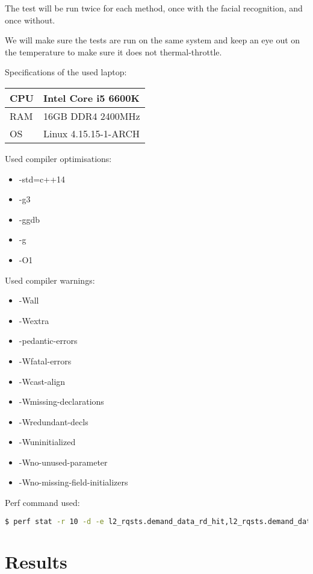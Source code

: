 \documentclass[a4paper]{article}
\begin{document}
The test will be run twice for each method, once with the facial recognition, and once without.

We will make sure the tests are run on the same system and keep an eye out on the temperature to make sure it does not thermal-throttle.

Specifications of the used laptop:
\begin{center}
    \begin{tabular}{ | l | l |}
    \hline
    CPU & Intel Core i5 6600K \cite{ARK} \\ \hline
    RAM & 16GB DDR4 2400MHz \\ \hline
    OS & Linux 4.15.15-1-ARCH \\ \hline
    \end{tabular}
\end{center}

Used compiler optimisations:
\begin{itemize}[noitemsep,nolistsep]
\item -std=c++14
\item -g3
\item -ggdb
\item -g
\item -O1
\end{itemize}

Used compiler warnings:
\begin{itemize}[noitemsep,nolistsep]
\item -Wall
\item -Wextra
\item -pedantic-errors
\item -Wfatal-errors
\item -Wcast-align
\item -Wmissing-declarations
\item -Wredundant-decls
\item -Wuninitialized
\item -Wno-unused-parameter
\item -Wno-missing-field-initializers
\end{itemize}

Perf command used:
\begin{lstlisting}[language=bash]
	$ perf stat -r 10 -d -e l2_rqsts.demand_data_rd_hit,l2_rqsts.demand_data_rd_miss ./vissen}
\end{lstlisting}

\newpage
\section{Results}
\end{document}
